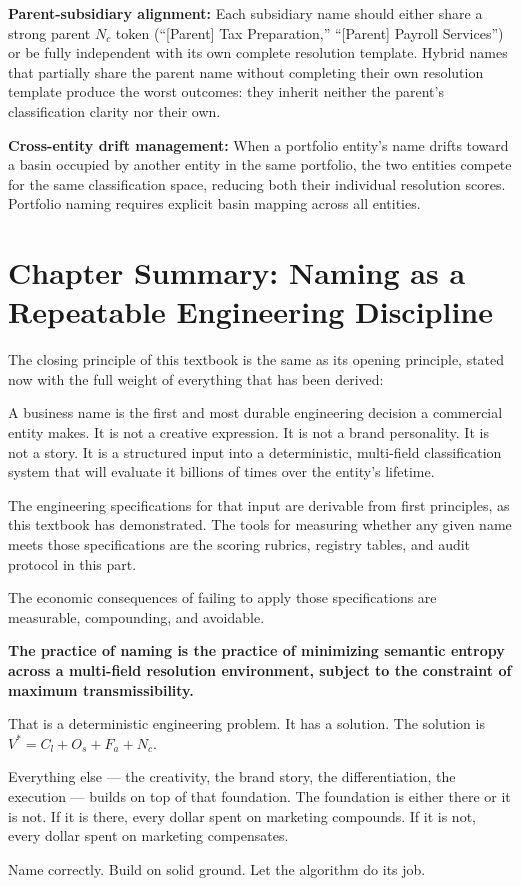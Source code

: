 \documentclass[12pt, openany]{book}
\theoremstyle{thmstyle}
\theoremstyle{defstyle}
\begin{document}
\textbf{Parent-subsidiary alignment:} Each subsidiary name should either share a strong parent $N_c$ token (``[Parent] Tax Preparation,'' ``[Parent] Payroll Services'') or be fully independent with its own complete resolution template. Hybrid names that partially share the parent name without completing their own resolution template produce the worst outcomes: they inherit neither the parent's classification clarity nor their own.

\textbf{Cross-entity drift management:} When a portfolio entity's name drifts toward a basin occupied by another entity in the same portfolio, the two entities compete for the same classification space, reducing both their individual resolution scores. Portfolio naming requires explicit basin mapping across all entities.

\section{Chapter Summary: Naming as a Repeatable Engineering Discipline}

The closing principle of this textbook is the same as its opening principle, stated now with the full weight of everything that has been derived:

\begin{keybox}
A business name is the first and most durable engineering decision a commercial entity makes. It is not a creative expression. It is not a brand personality. It is not a story. It is a structured input into a deterministic, multi-field classification system that will evaluate it billions of times over the entity's lifetime.

The engineering specifications for that input are derivable from first principles, as this textbook has demonstrated. The tools for measuring whether any given name meets those specifications are the scoring rubrics, registry tables, and audit protocol in this part.

The economic consequences of failing to apply those specifications are measurable, compounding, and avoidable.

\textbf{The practice of naming is the practice of minimizing semantic entropy across a multi-field resolution environment, subject to the constraint of maximum transmissibility.}

That is a deterministic engineering problem. It has a solution. The solution is $V^* = C_l + O_s + F_a + N_c$.

Everything else --- the creativity, the brand story, the differentiation, the execution --- builds on top of that foundation. The foundation is either there or it is not. If it is there, every dollar spent on marketing compounds. If it is not, every dollar spent on marketing compensates.

Name correctly. Build on solid ground. Let the algorithm do its job.
\end{keybox}
\end{document}

